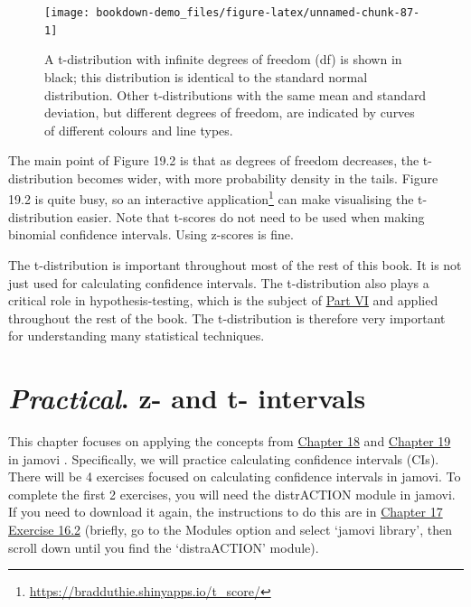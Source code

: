 \documentclass[
]{scrbook}
\begin{document}
\begin{figure}
\texttt{[image: bookdown-demo\_files/figure-latex/unnamed-chunk-87-1]} \caption{A t-distribution with infinite degrees of freedom (df) is shown in black; this distribution is identical to the standard normal distribution. Other t-distributions with the same mean and standard deviation, but different degrees of freedom, are indicated by curves of different colours and line types.}\label{fig:unnamed-chunk-87}
\end{figure}

The main point of Figure 19.2 is that as degrees of freedom decreases, the t-distribution becomes wider, with more probability density in the tails.
Figure 19.2 is quite busy, so an interactive application\footnote{\url{https://bradduthie.shinyapps.io/t_score/}} can make visualising the t-distribution easier.
Note that t-scores do not need to be used when making binomial confidence intervals.
Using z-scores is fine.

The t-distribution is important throughout most of the rest of this book.
It is not just used for calculating confidence intervals.
The t-distribution also plays a critical role in hypothesis-testing, which is the subject of \protect\hyperlink{Week_6}{Part VI} and applied throughout the rest of the book.
The t-distribution is therefore very important for understanding many statistical techniques.

\hypertarget{Chapter_20}{%
\chapter{\texorpdfstring{\emph{Practical}. z- and t- intervals}{Practical. z- and t- intervals}}\label{Chapter_20}}

This chapter focuses on applying the concepts from \protect\hyperlink{Chapter_18}{Chapter 18} and \protect\hyperlink{Chapter_19}{Chapter 19} in jamovi \citep{Jamovi2022}.
Specifically, we will practice calculating confidence intervals (CIs).
There will be 4 exercises focused on calculating confidence intervals in jamovi.
To complete the first 2 exercises, you will need the distrACTION module in jamovi.
If you need to download it again, the instructions to do this are in \protect\hyperlink{Chapter_17}{Chapter 17} \href{https://bradduthie.github.io/SCIU4T4/Chapter_17.html\#probabilities-from-a-normal-distribution}{Exercise 16.2} (briefly, go to the Modules option and select `jamovi library', then scroll down until you find the `distraACTION' module).
\end{document}
